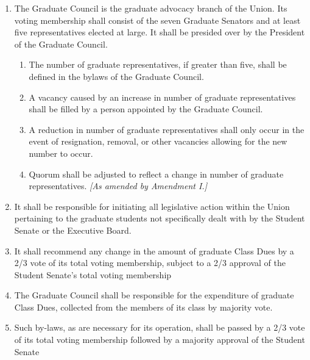 
\begin{enumerate}
\item The Graduate Council is the graduate advocacy branch of the Union. Its voting membership shall consist of the seven Graduate Senators and at least five representatives elected at large. It shall be presided over by the President of the Graduate Council.
  \begin{enumerate}
  \item The number of graduate representatives, if greater than five, shall be defined in the bylaws of the Graduate Council.
  \item A vacancy caused by an increase in number of graduate representatives shall be filled by a person appointed by the Graduate Council.
  \item A reduction in number of graduate representatives shall only occur in the event of resignation, removal, or other vacancies allowing for the new number to occur.
  \item Quorum shall be adjusted to reflect a change in number of graduate representatives. \textit{[As amended by Amendment I.]}
  \end{enumerate}
\item It shall be responsible for initiating all legislative action within the Union pertaining to the graduate students not specifically dealt with by the Student Senate or the Executive Board.
\item It shall recommend any change in the amount of graduate Class Dues by a 2/3 vote of its total voting membership, subject to a 2/3 approval of the Student Senate's total voting membership
\item The Graduate Council shall be responsible for the expenditure of graduate Class Dues, collected from the members of its class by majority vote.
\item Such by-laws, as are necessary for its operation, shall be passed by a 2/3 vote of its total voting membership followed by a majority approval of the Student Senate
\end{enumerate}


